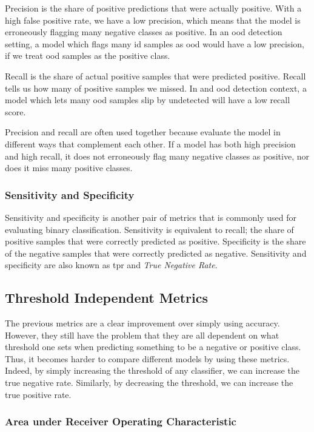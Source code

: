 \documentclass[UKenglish]{uiomasterthesis} %
\theoremstyle{definition}
\begin{document}
Precision is the share of positive predictions that were actually positive. With a high false positive rate, we have a low precision, which means that the model is erroneously flagging many negative classes as positive. In an \ac{ood} detection setting, a model which flags many \ac{id} samples as \ac{ood} would have a low precision, if we treat \ac{ood} samples as the positive class.

Recall is the share of actual positive samples that were predicted positive. Recall tells us how many of positive samples we missed. In and \ac{ood} detection context, a model which lets many \ac{ood} samples slip by undetected will have a low recall score.

Precision and recall are often used together because evaluate the model in different ways that complement each other. If a model has both high precision and high recall, it does not erroneously flag many negative classes as positive, nor does it miss many positive classes.

\subsubsection{Sensitivity and Specificity}

Sensitivity and specificity is another pair of metrics that is commonly used for evaluating binary classification. Sensitivity is equivalent to recall; the share of positive samples that were correctly predicted as positive. Specificity is the share of the negative samples that were correctly predicted as negative. Sensitivity and specificity are also known as \ac{tpr} and {\it True Negative Rate}.

\subsection{Threshold Independent Metrics}

The previous metrics are a clear improvement over simply using accuracy. However, they still have the problem that they are all dependent on what threshold one sets when predicting something to be a negative or positive class. Thus, it becomes harder to compare different models by using these metrics. Indeed, by simply increasing the threshold of any classifier, we can increase the true negative rate. Similarly, by decreasing the threshold, we can increase the true positive rate.\\

\subsubsection{Area under Receiver Operating Characteristic}
\end{document}
